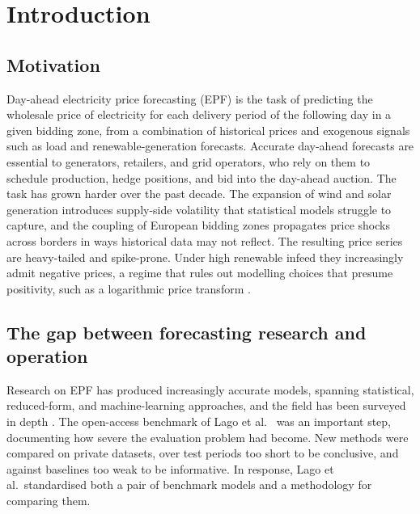 \chapter{Introduction}
\label{ch:introduction}

\section{Motivation}

Day-ahead electricity price forecasting (EPF) is the task of predicting the
wholesale price of electricity for each delivery period of the following day in
a given bidding zone, from a combination of historical prices and exogenous
signals such as load and renewable-generation forecasts. Accurate day-ahead
forecasts are essential to generators, retailers, and grid operators, who rely
on them to schedule production, hedge positions, and bid into the day-ahead
auction. The task has grown harder over the past decade. The expansion of wind
and solar generation introduces supply-side volatility that statistical models
struggle to capture, and the coupling of European bidding zones propagates price
shocks across borders in ways historical data may not reflect. The resulting
price series are heavy-tailed and spike-prone. Under high renewable infeed they
increasingly admit negative prices, a regime that rules out modelling choices
that presume positivity, such as a logarithmic price transform
\cite{weron2014}.

\section{The gap between forecasting research and operation}

Research on EPF has produced increasingly accurate models, spanning statistical,
reduced-form, and machine-learning approaches, and the field has been surveyed in
depth \cite{weron2014, nowotarski2018}. The open-access benchmark of Lago et al.\
\cite{lago2021} was an important step, documenting how severe the evaluation
problem had become. New methods were compared on private datasets, over test
periods too short to be conclusive, and against baselines too weak to be
informative. In response, Lago et al.\ standardised both a pair of benchmark
models and a methodology for comparing them.

